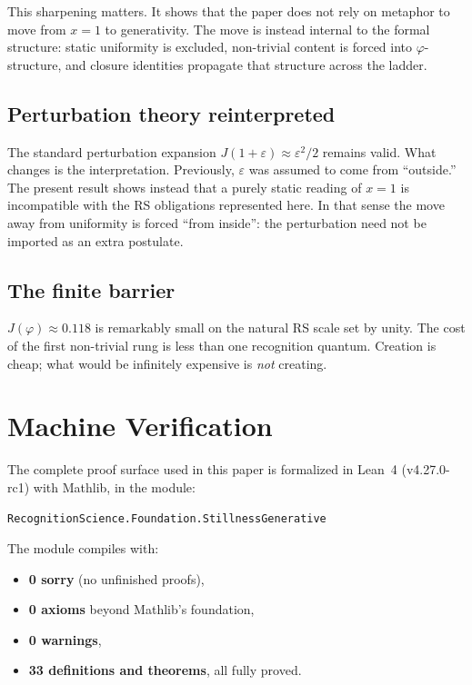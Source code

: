 \documentclass[11pt,a4paper]{article}
\newcommand{\Jcost}{J}
\newcommand{\phirs}{\varphi}
\begin{document}
This sharpening matters.  It shows that the paper does not rely on metaphor to move from $x=1$ to generativity.  The move is instead internal to the formal structure: static uniformity is excluded, non-trivial content is forced into $\phirs$-structure, and closure identities propagate that structure across the ladder.

\subsection{Perturbation theory reinterpreted}

The standard perturbation expansion $\Jcost(1+\varepsilon)\approx\varepsilon^2/2$ remains valid.  What changes is the interpretation.  Previously, $\varepsilon$ was assumed to come from ``outside.''  The present result shows instead that a purely static reading of $x=1$ is incompatible with the RS obligations represented here.  In that sense the move away from uniformity is forced ``from inside'': the perturbation need not be imported as an extra postulate.

\subsection{The finite barrier}

$\Jcost(\phirs)\approx 0.118$ is remarkably small on the natural RS scale set by unity.  The cost of the first non-trivial rung is less than one recognition quantum.  Creation is cheap; what would be infinitely expensive is \emph{not} creating.

\section{Machine Verification}
\label{sec:lean}

The complete proof surface used in this paper is formalized in Lean~4 (v4.27.0-rc1) with Mathlib, in the module:
\begin{center}
\texttt{RecognitionScience.Foundation.StillnessGenerative}
\end{center}
The module compiles with:
\begin{itemize}
\item \textbf{0 sorry} (no unfinished proofs),
\item \textbf{0 axioms} beyond Mathlib's foundation,
\item \textbf{0 warnings},
\item \textbf{33 definitions and theorems}, all fully proved.
\end{itemize}
\end{document}
